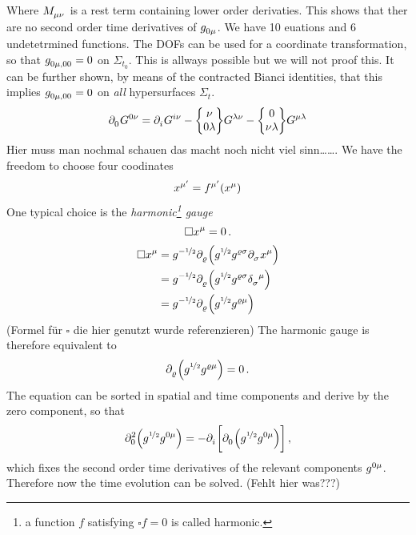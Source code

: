 Where $\tensor{M}{_\mu_\nu}$ is a rest term containing lower order derivaties.
This shows that ther are no second order time derivatives of
$\tensor{g}{_0_\mu}$. We have 10 euations and 6 undetetrmined functions. The
DOFs can be used for a coordinate transformation, so that
$\tensor{g}{_0_\mu_{,00}}=0$ on $\Sigma_{t_0}$. This is allways possible but we
will not proof this. It can be further shown, by means of the contracted Bianci
identities, that this implies $\tensor{g}{_0_\mu_{,00}}=0$ on \emph{all}
hypersurfaces $\Sigma_{t}$.
\begin{equation}
\tensor{\partial}{_0}\tensor{G}{^0^\nu}=
\tensor{\partial}{_i}\tensor{G}{^i^\nu}
-\cSym{\nu}{0}{\lambda}\tensor{G}{^\lambda^\nu}
-\cSym{0}{\nu}{\lambda}\tensor{G}{^\mu^\lambda}
\end{equation}
Hier muss man nochmal schauen das macht noch nicht viel sinn\ldots\ldots.
We have the freedom to choose four coodinates
\begin{equation}
\tensor{x}{^{\mu^\prime}}=\tensor{f}{^{\mu^\prime}}\left(\tensor{x}{^\mu}\right)
\end{equation}
One typical choice is the \emph{harmonic\footnote{a function $f$ satisfying
$\square f = 0$ is called harmonic.} gauge}
\begin{equation}
\square\tensor{x}{^\mu}=0\,.
\end{equation}
\begin{equation}
\begin{split}
\square\tensor{x}{^\mu}&=g^{-\nicefrac{1}{2}}\tensor{\partial}{_\varrho}\left(g^{\nicefrac{1}{2}}\tensor{g}{^\varrho^\sigma}\tensor{\partial}{_\sigma}\tensor{x}{^\mu}\right)\\
&=g^{-\nicefrac{1}{2}}\tensor{\partial}{_\varrho}\left(g^{\nicefrac{1}{2}}\tensor{g}{^\varrho^\sigma}\tensor{\delta}{_\sigma^\mu}\right)\\
&=g^{-\nicefrac{1}{2}}\tensor{\partial}{_\varrho}\left(g^{\nicefrac{1}{2}}\tensor{g}{^\varrho^\mu}\right)\\
\end{split}
\end{equation}
(Formel für $\square$ die hier genutzt wurde referenzieren)
The harmonic gauge is therefore equivalent to
\begin{equation}
\tensor{\partial}{_\varrho}\left(g^{\nicefrac{1}{2}}\tensor{g}{^\varrho^\mu}\right)=0\,
.\\
\end{equation}
The equation can be sorted in spatial and time components and derive by the
zero component, so that
\begin{equation}
\tensor*{\partial}{*_0^2}\left(g^{\nicefrac{1}{2}}\tensor{g}{^0^\mu}\right)
=
-\tensor{\partial}{_i}\left[\tensor{\partial}{_0}\left(g^{\nicefrac{1}{2}}\tensor{g}{^0^\mu}\right)\right]\,
,\end{equation}
which fixes the second order time derivatives of the relevant components
$\tensor{g}{^0^\mu}$. Therefore now the time evolution can be solved. (Fehlt
hier was???)
